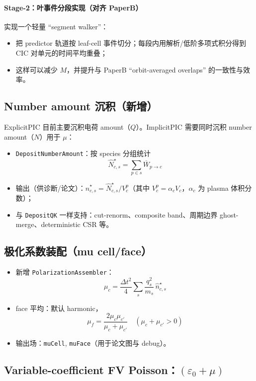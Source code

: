 \documentclass[UTF8,a4paper,12pt]{ctexart}
\newcommand{\code}[1]{\texttt{#1}}
\newcommand{\dt}{\Delta t}
\begin{document}
\paragraph{Stage-2：叶事件分段实现（对齐 PaperB）}
实现一个轻量 ``segment walker''：
\begin{itemize}[leftmargin=2em]
  \item 把 predictor 轨道按 leaf-cell 事件切分；每段内用解析/低阶多项式积分得到 CIC 对单元的时间平均重叠；
  \item 这样可以减少 $M$，并提升与 PaperB ``orbit-averaged overlaps'' 的一致性与效率。
\end{itemize}

\subsection{Number amount 沉积（新增）}
ExplicitPIC 目前主要沉积电荷 amount（$Q$）。ImplicitPIC 需要同时沉积 number amount（$N$）用于 $\mu$：
\begin{itemize}[leftmargin=2em]
  \item \code{DepositNumberAmount}：按 species 分组统计
  \[
    \widehat{N}_{c,s}^\star = \sum_{p\in s} \overline{W}_{p\to c}
  \]
  \item 输出（供诊断/论文）：$\hat n^\star_{c,s}=\widehat{N}^\star_{c,s}/V_c^p$（其中 $V_c^p=\alpha_c V_c$，$\alpha_c$ 为 plasma 体积分数）；
  \item 与 \code{DepositQK} 一样支持：cut-renorm、composite band、周期边界 ghost-merge、deterministic CSR 等。
\end{itemize}

\subsection{极化系数装配（mu cell/face）}
\begin{itemize}[leftmargin=2em]
  \item 新增 \code{PolarizationAssembler}：
  \[
    \mu_c=\frac{\dt^2}{4}\sum_s\frac{q_s^2}{m_s}\,\hat n^\star_{c,s}
  \]
  \item face 平均：默认 harmonic，
  \[
    \mu_f=\frac{2\mu_c\mu_{c'}}{\mu_c+\mu_{c'}}\quad(\mu_c+\mu_{c'}>0)
  \]
  \item 输出场：\code{muCell}, \code{muFace}（用于论文图与 debug）。
\end{itemize}

\subsection{Variable-coefficient FV Poisson：$(\varepsilon_0+\mu)$}
\label{sec:vpoisson}
\end{document}
